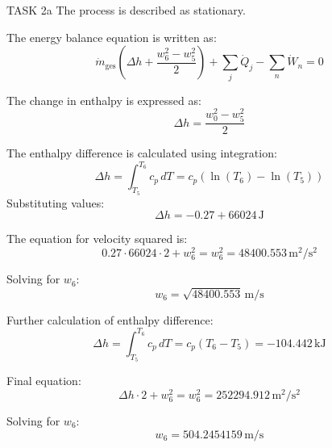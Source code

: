 TASK 2a  
The process is described as stationary.  

The energy balance equation is written as:  
\[
\dot{m}_{\text{ges}} \left( \Delta h + \frac{w_6^2 - w_5^2}{2} \right) + \sum_j \dot{Q}_j - \sum_n \dot{W}_n = 0
\]  

The change in enthalpy is expressed as:  
\[
\Delta h = \frac{w_0^2 - w_5^2}{2}
\]  

The enthalpy difference is calculated using integration:  
\[
\Delta h = \int_{T_5}^{T_6} c_p \, dT = c_p \left( \ln(T_6) - \ln(T_5) \right)
\]  
Substituting values:  
\[
\Delta h = -0.27 + 66024 \, \text{J}
\]  

The equation for velocity squared is:  
\[
0.27 \cdot 66024 \cdot 2 + w_6^2 = w_6^2 = 48400.553 \, \text{m}^2/\text{s}^2
\]  

Solving for \( w_6 \):  
\[
w_6 = \sqrt{48400.553} \, \text{m/s}
\]  

Further calculation of enthalpy difference:  
\[
\Delta h = \int_{T_5}^{T_6} c_p \, dT = c_p (T_6 - T_5) = -104.442 \, \text{kJ}
\]  

Final equation:  
\[
\Delta h \cdot 2 + w_6^2 = w_6^2 = 252294.912 \, \text{m}^2/\text{s}^2
\]  

Solving for \( w_6 \):  
\[
w_6 = 504.2454159 \, \text{m/s}
\]